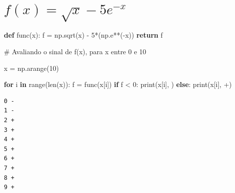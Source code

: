 \documentclass[
  letterpaper,
  DIV=11,
  numbers=noendperiod]{scrreprt}
\newenvironment{Shaded}{\begin{snugshade}}{\end{snugshade}}
\newcommand{\BuiltInTok}[1]{\textcolor[rgb]{0.00,0.23,0.31}{#1}}
\newcommand{\CommentTok}[1]{\textcolor[rgb]{0.37,0.37,0.37}{#1}}
\newcommand{\ControlFlowTok}[1]{\textcolor[rgb]{0.00,0.23,0.31}{\textbf{#1}}}
\newcommand{\DecValTok}[1]{\textcolor[rgb]{0.68,0.00,0.00}{#1}}
\newcommand{\KeywordTok}[1]{\textcolor[rgb]{0.00,0.23,0.31}{\textbf{#1}}}
\newcommand{\NormalTok}[1]{\textcolor[rgb]{0.00,0.23,0.31}{#1}}
\newcommand{\OperatorTok}[1]{\textcolor[rgb]{0.37,0.37,0.37}{#1}}
\newcommand{\StringTok}[1]{\textcolor[rgb]{0.13,0.47,0.30}{#1}}
\begin{document}
\chapter{\texorpdfstring{\(f(x) = \sqrt{x} - 5e^{-x}\)}{f(x) = \textbackslash sqrt\{x\} - 5e\^{}\{-x\}}}\label{fx-sqrtx---5e-x}

\begin{Shaded}
\begin{Highlighting}[]
\KeywordTok{def}\NormalTok{ func(x):}
\NormalTok{    f }\OperatorTok{=}\NormalTok{ np.sqrt(x) }\OperatorTok{{-}} \DecValTok{5}\OperatorTok{*}\NormalTok{(np.e}\OperatorTok{**}\NormalTok{(}\OperatorTok{{-}}\NormalTok{x))}
    \ControlFlowTok{return}\NormalTok{ f}
\end{Highlighting}
\end{Shaded}

\begin{Shaded}
\begin{Highlighting}[]
\CommentTok{\# Avaliando o sinal de f(x), para x entre 0 e 10}

\NormalTok{x }\OperatorTok{=}\NormalTok{ np.arange(}\DecValTok{10}\NormalTok{)}

\ControlFlowTok{for}\NormalTok{ i }\KeywordTok{in} \BuiltInTok{range}\NormalTok{(}\BuiltInTok{len}\NormalTok{(x)):}
\NormalTok{    f }\OperatorTok{=}\NormalTok{ func(x[i])}
    \ControlFlowTok{if}\NormalTok{ f }\OperatorTok{\textless{}} \DecValTok{0}\NormalTok{:}
        \BuiltInTok{print}\NormalTok{(x[i], }\StringTok{\textquotesingle{}{-}\textquotesingle{}}\NormalTok{)}
    \ControlFlowTok{else}\NormalTok{:}
        \BuiltInTok{print}\NormalTok{(x[i], }\StringTok{\textquotesingle{}+\textquotesingle{}}\NormalTok{)}
\end{Highlighting}
\end{Shaded}

\begin{verbatim}
0 -
1 -
2 +
3 +
4 +
5 +
6 +
7 +
8 +
9 +
\end{verbatim}
\end{document}
